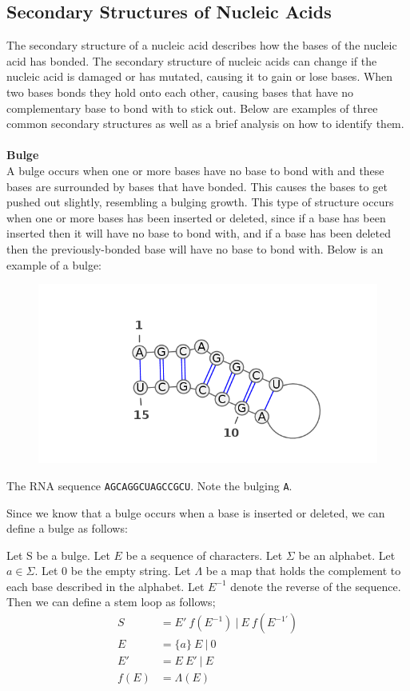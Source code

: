 

\subsection{Secondary Structures of Nucleic Acids}\label{structs}
The secondary structure of a nucleic acid describes how the bases of the 
nucleic acid has bonded. The secondary structure of nucleic acids can change if 
the nucleic acid is damaged or has mutated, causing it to gain or lose 
bases. When two bases bonds they hold onto each other, causing bases that 
have no complementary base to bond with to stick out. Below are examples of three 
common secondary structures as well as a brief analysis on how to identify them.\\\\
\textbf{Bulge}\\ 
A bulge occurs when one or more bases have no base to bond with and these 
bases are surrounded by bases that have bonded. This causes the bases to get 
pushed out slightly, resembling a bulging growth. This type of structure occurs 
when one or more bases has been inserted or deleted, since if a base has been 
inserted then it will have no base to bond with, and if a base has been deleted 
then the previously-bonded base will have no base to bond with. 
Below is an example of a bulge:
\begin{myex}\centering
\begin{figure}[h]
\includegraphics[scale=0.4]{./lib/bulge.png}
\end{figure}
The RNA sequence {\tt AGCAGGCUAGCCGCU}. Note the bulging {\tt A}.
\end{myex}
Since we know that a bulge occurs when a base is inserted or deleted, we can 
define a bulge as follows:
\begin{mydef}\centering
Let S be a bulge. Let $E$ be a sequence of characters. Let $\Sigma$ be an alphabet. 
Let $a \in \Sigma$. Let $0$ be the empty string. Let $\Lambda$ be a map that holds the complement to each 
base described in the alphabet. Let $E^{-1}$ denote the reverse of the sequence. 
Then we can define a stem loop as follows;
\begin{align*}
S    &= E'~f(E^{-1})~|~E~f(E^{-1\prime})\\
E    &= \{a\}~E~|~0\\
E'   &= E~E'~|~E\\
f(E) &= \Lambda(E)
\end{align*}
\end{mydef}
